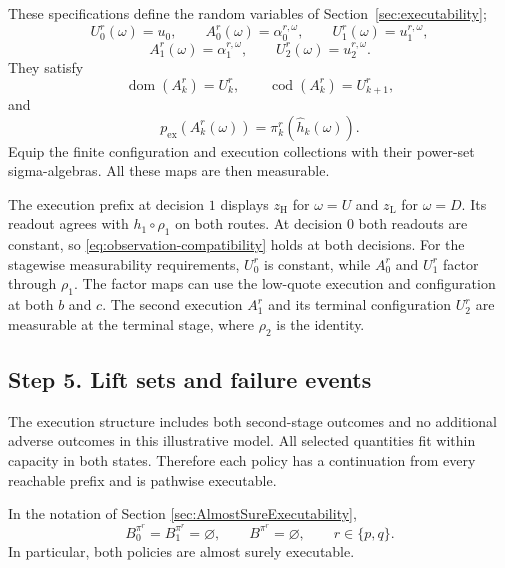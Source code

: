 \documentclass[11pt,a4paper]{article}
\begin{document}
These specifications define the random variables of 
Section~\ref{sec:executability};
\[
  U_0^r(\omega)=u_0,\qquad
  A_0^r(\omega)=\alpha_0^{r,\omega},\qquad
  U_1^r(\omega)=u_1^{r,\omega},
\]
\[
  A_1^r(\omega)=\alpha_1^{r,\omega},
  \qquad
  U_2^r(\omega)=u_2^{r,\omega}.
\]
They satisfy
\[
  \operatorname{dom}(A_k^r)=U_k^r,\qquad
  \operatorname{cod}(A_k^r)=U_{k+1}^r,
\]
and
\[
  p_{\mathrm{ex}}(A_k^r(\omega))
  =
  \pi_k^r(\widehat h_k(\omega)).
\]
Equip the finite configuration and execution collections with
their power-set sigma-algebras.
All these maps are then measurable.

The execution prefix at decision $1$ displays $z_{\mathrm H}$ for
$\omega=U$ and $z_{\mathrm L}$ for $\omega=D$. Its readout agrees with
$h_1\circ\rho_1$ on both routes. At decision $0$ both readouts are constant,
so \eqref{eq:observation-compatibility} holds at both decisions.
For the stagewise measurability requirements, $U_0^r$ is constant,
while $A_0^r$ and $U_1^r$ factor through $\rho_1$. The factor maps can
use the low-quote execution and configuration at both $b$ and $c$.
The second execution $A_1^r$ and its terminal configuration $U_2^r$
are measurable at the terminal stage, where $\rho_2$ is the identity.

\subsection{Step 5. Lift sets and failure events}

The execution structure includes both second-stage outcomes and
no additional adverse outcomes in this illustrative model.
All selected quantities fit within capacity in both states.
Therefore each policy has a continuation from every reachable
prefix and is pathwise executable.

In the notation of 
Section \ref{sec:AlmostSureExecutability},
\[
  B_0^{\pi^r}=B_1^{\pi^r}=\varnothing,
  \qquad
  B^{\pi^r}=\varnothing,
  \qquad r\in\{p,q\}.
\]
In particular, both policies are almost surely executable.
\end{document}

